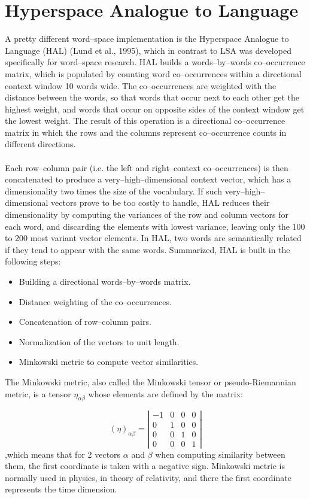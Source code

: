 \section{Hyperspace Analogue to Language}
A pretty different word--space implementation is the Hyperspace Analogue to Language (HAL) (Lund et al., 1995), which in contrast to LSA was developed specifically for word--space research. HAL builds a words--by--words co--occurrence matrix, which is populated by counting word co--occurrences within a directional context window 10 words wide. The co--occurrences are weighted with the distance between the words, so that words that occur next to each other get the highest weight, and words that occur on opposite sides of the context window get the lowest weight. The result of this operation is a directional co--occurrence matrix in which the rows and the columns represent co--occurrence counts in different directions.
\\\\  Each row--column pair (i.e. the left and right--context co--occurrences) is then concatenated to produce a very--high--dimensional context vector, which has a dimensionality two times the size of the vocabulary. If such very--high--dimensional vectors prove to be too costly to handle, HAL reduces their dimensionality by computing the variances of the row and column vectors for each word, and discarding the elements with lowest variance, leaving only the 100 to 200 most variant vector elements. In HAL,  two words are semantically related if they tend to appear with the same words.
Summarized, HAL is built in the following steps:
\begin{itemize}
\item Building a directional words--by--words matrix.
\item Distance weighting of the co--occurrences.
\item Concatenation of row--column pairs.
\item Normalization of the vectors to unit length.
\item Minkowski metric to compute vector similarities.
\end{itemize}

The Minkowski metric, also called the Minkowski tensor or pseudo-Riemannian metric, is a tensor  $\eta_{\alpha\beta}$ whose elements are defined by the matrix:

\[  (\eta)_{\alpha\beta}=\left
|\begin{array}{cccc}
-1 & 0 & 0 & 0 \\
0 & 1& 0 & 0  \\
0 & 0& 1 & 0  \\
0 & 0& 0 & 1   \end{array} \right| \]
,which means that for 2 vectors $\alpha$ and $\beta$ when computing similarity between them, the first 
coordinate is taken with a negative sign. Minkowski metric is normally used in physics, in theory of relativity, and
there the first coordinate represents the time dimension.


